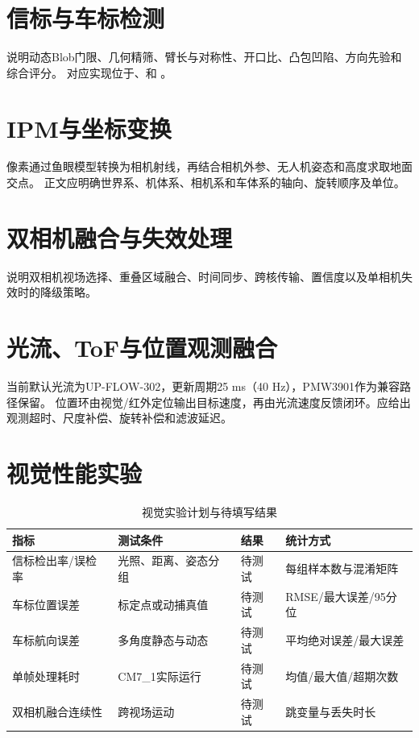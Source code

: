 
\section{信标与车标检测}

说明动态Blob门限、几何精筛、臂长与对称性、开口比、凸包凹陷、方向先验和综合评分。
对应实现位于、和
。

\section{IPM与坐标变换}

像素通过鱼眼模型转换为相机射线，再结合相机外参、无人机姿态和高度求取地面交点。
正文应明确世界系、机体系、相机系和车体系的轴向、旋转顺序及单位。

\section{双相机融合与失效处理}

说明双相机视场选择、重叠区域融合、时间同步、跨核传输、置信度以及单相机失效时的降级策略。

\section{光流、ToF与位置观测融合}

当前默认光流为UP-FLOW-302，更新周期25 ms（40 Hz），PMW3901作为兼容路径保留。
位置环由视觉/红外定位输出目标速度，再由光流速度反馈闭环。应给出观测超时、尺度补偿、旋转补偿和滤波延迟。

\section{视觉性能实验}

\begin{table}[htbp]
  \centering
  \caption{视觉实验计划与待填写结果}
  \begin{tabularx}{\textwidth}{p{3.1cm}p{3.3cm}p{3.1cm}X}
    \toprule
    指标 & 测试条件 & 结果 & 统计方式 \\
    \midrule
    信标检出率/误检率 & 光照、距离、姿态分组 & 待测试 & 每组样本数与混淆矩阵 \\
    车标位置误差 & 标定点或动捕真值 & 待测试 & RMSE/最大误差/95分位 \\
    车标航向误差 & 多角度静态与动态 & 待测试 & 平均绝对误差/最大误差 \\
    单帧处理耗时 & CM7\_1实际运行 & 待测试 & 均值/最大值/超期次数 \\
    双相机融合连续性 & 跨视场运动 & 待测试 & 跳变量与丢失时长 \\
    \bottomrule
  \end{tabularx}
\end{table}
